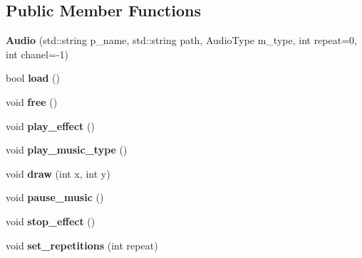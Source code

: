 \subsection*{Public Member Functions}
\begin{DoxyCompactItemize}
\item 
{\bfseries Audio} (std\+::string p\+\_\+name, std\+::string path, Audio\+Type m\+\_\+type, int repeat=0, int chanel=-\/1)\hypertarget{classengine_1_1_audio_a1b723136c787deae501ca667e3d367a1}{}\label{classengine_1_1_audio_a1b723136c787deae501ca667e3d367a1}

\item 
bool {\bfseries load} ()\hypertarget{classengine_1_1_audio_a98b4a31bcd84f4a6868b414f347bc72e}{}\label{classengine_1_1_audio_a98b4a31bcd84f4a6868b414f347bc72e}

\item 
void {\bfseries free} ()\hypertarget{classengine_1_1_audio_afa4c5b2b7c325cafb74707ce026ddb3c}{}\label{classengine_1_1_audio_afa4c5b2b7c325cafb74707ce026ddb3c}

\item 
void {\bfseries play\+\_\+effect} ()\hypertarget{classengine_1_1_audio_a337e36c3f7695aeb241bd2e6b46480b2}{}\label{classengine_1_1_audio_a337e36c3f7695aeb241bd2e6b46480b2}

\item 
void {\bfseries play\+\_\+music\+\_\+type} ()\hypertarget{classengine_1_1_audio_ad25f1248a483fc53bfa4d963b859355c}{}\label{classengine_1_1_audio_ad25f1248a483fc53bfa4d963b859355c}

\item 
void {\bfseries draw} (int x, int y)\hypertarget{classengine_1_1_audio_a0c8d23551a3a27ce6a666cb2560d7a75}{}\label{classengine_1_1_audio_a0c8d23551a3a27ce6a666cb2560d7a75}

\item 
void {\bfseries pause\+\_\+music} ()\hypertarget{classengine_1_1_audio_a04276d10a4c43f6997ce61d197d0cd06}{}\label{classengine_1_1_audio_a04276d10a4c43f6997ce61d197d0cd06}

\item 
void {\bfseries stop\+\_\+effect} ()\hypertarget{classengine_1_1_audio_a69d99c1da8a77dc660a18ae9234d57b9}{}\label{classengine_1_1_audio_a69d99c1da8a77dc660a18ae9234d57b9}

\item 
void {\bfseries set\+\_\+repetitions} (int repeat)\hypertarget{classengine_1_1_audio_ab2cf1a3543da1043fdf7321e17b3d75e}{}\label{classengine_1_1_audio_ab2cf1a3543da1043fdf7321e17b3d75e}


\end{DoxyCompactItemize}

